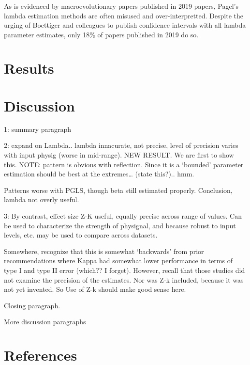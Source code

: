 \documentclass[
]{article}
\begin{document}
As is evidenced by macroevolutionary papers published in 2019 papers,
Pagel's lambda estimation methods are often misused and
over-interpretted. Despite the urging of Boettiger and colleagues to
publish confidence intervals with all lambda parameter estimates, only
18\% of papers published in 2019 do so.

\hypertarget{results-1}{%
\section{Results}\label{results-1}}

\hypertarget{discussion}{%
\section{Discussion}\label{discussion}}

1: summary paragraph

2: expand on Lambda.. lambda innacurate, not precise, level of precision
varies with input physig (worse in mid-range). NEW RESULT. We are first
to show this. NOTE: pattern is obvious with reflection. Since it is a
`bounded' parameter estimation should be best at the extremes\ldots{}
(state this?).. hmm.

Patterns worse with PGLS, though beta still estimated properly.
Conclusion, lambda not overly useful.

3: By contrast, effect size Z-K useful, equally precise across range of
values. Can be used to characterize the strength of physignal, and
because robust to input levels, etc. may be used to compare across
datasets.

Somewhere, recognize that this is somewhat `backwards' from prior
recommendations where Kappa had somewhat lower performance in terms of
type I and type II error (which?? I forget). However, recall that those
studies did not examine the precision of the estimates. Nor was Z-k
included, because it was not yet invented. So Use of Z-k should make
good sense here.

Closing paragraph.

\hfill\break

More discussion paragraphs

\newpage

\hypertarget{references}{%
\section{References}\label{references}}

\setlength{\parindent}{-0.25in} \setlength{\leftskip}{0.25in}
\setlength{\parskip}{8pt} \noindent
\end{document}
